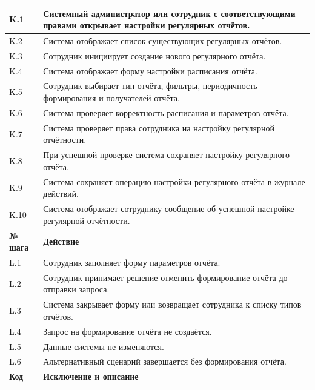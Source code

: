 \documentclass[12pt,a4paper]{article}
\begin{document}
\begin{xltabular}{\textwidth}{
				|>{\raggedright\arraybackslash}p{2.7cm}
				|>{\raggedright\arraybackslash}X|
			}
			K.1 & Системный администратор или сотрудник с соответствующими правами
			открывает настройки регулярных отчётов. \\
			\hline
			K.2 & Система отображает список существующих регулярных отчётов. \\
			\hline
			K.3 & Сотрудник инициирует создание нового регулярного отчёта. \\
			\hline
			K.4 & Система отображает форму настройки расписания отчёта. \\
			\hline
			K.5 & Сотрудник выбирает тип отчёта, фильтры, периодичность формирования
			и получателей отчёта. \\
			\hline
			K.6 & Система проверяет корректность расписания и параметров отчёта. \\
			\hline
			K.7 & Система проверяет права сотрудника на настройку регулярной
			отчётности. \\
			\hline
			K.8 & При успешной проверке система сохраняет настройку регулярного
			отчёта. \\
			\hline
			K.9 & Система сохраняет операцию настройки регулярного отчёта в журнале
			действий. \\
			\hline
			K.10 & Система отображает сотруднику сообщение об успешной настройке
			регулярной отчётности. \\
			\hline
			
			
			\textbf{№ шага} & \textbf{Действие} \\
			\hline
			
			L.1 & Сотрудник заполняет форму параметров отчёта. \\
			\hline
			L.2 & Сотрудник принимает решение отменить формирование отчёта до
			отправки запроса. \\
			\hline
			L.3 & Система закрывает форму или возвращает сотрудника к списку типов
			отчётов. \\
			\hline
			L.4 & Запрос на формирование отчёта не создаётся. \\
			\hline
			L.5 & Данные системы не изменяются. \\
			\hline
			L.6 & Альтернативный сценарий завершается без формирования отчёта. \\
			\hline
			
			
			\textbf{Код} & \textbf{Исключение и описание} \\
			\hline
			

\end{xltabular}
\end{document}

